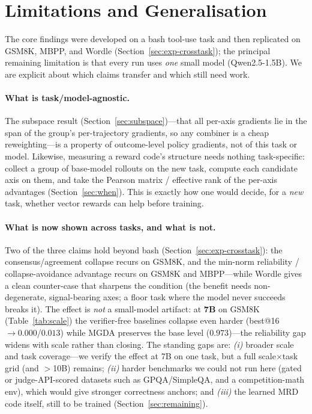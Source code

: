 \documentclass[11pt,a4paper]{article}
\begin{document}
\section{Limitations and Generalisation}
\label{sec:limitations}

The core findings were developed on a bash tool-use task and then replicated on
GSM8K, MBPP, and Wordle (Section~\ref{sec:exp-crosstask}); the principal
remaining limitation is that every run uses \emph{one} small model
(Qwen2.5-1.5B).  We are explicit about which claims transfer and which still need
work.

\paragraph{What is task/model-agnostic.}
The subspace result (Section~\ref{sec:subspace})---that all per-axis gradients
lie in the span of the group's per-trajectory gradients, so any combiner is a
cheap reweighting---is a property of outcome-level policy gradients, not of this
task or model.  Likewise, measuring a reward code's structure needs nothing
task-specific: collect a group of base-model rollouts on the new task, compute
each candidate axis on them, and take the Pearson matrix / effective rank of the
per-axis advantages (Section~\ref{sec:when}).  This is exactly how one would
decide, for a \emph{new} task, whether vector rewards can help before training.

\paragraph{What is now shown across tasks, and what is not.}
Two of the three claims hold beyond bash (Section~\ref{sec:exp-crosstask}): the
consensus/agreement collapse recurs on GSM8K, and the min-norm reliability /
collapse-avoidance advantage recurs on GSM8K and MBPP---while Wordle gives a
clean counter-case that sharpens the condition (the benefit needs
non-degenerate, signal-bearing axes; a floor task where the model never succeeds
breaks it).  The effect is \emph{not} a small-model artifact: at \textbf{7B} on
GSM8K (Table~\ref{tab:scale}) the verifier-free baselines collapse even harder
(best@16 $\to 0.000$/$0.013$) while MGDA preserves the base level
($0.973$)---the reliability gap widens with scale rather than closing.  The
standing gaps are: \emph{(i)} broader scale and task coverage---we verify the
effect at 7B on one task, but a full scale$\times$task grid (and $>$10B) remains;
\emph{(ii)} harder benchmarks we could not run here (gated or judge-API-scored
datasets such as GPQA/SimpleQA, and a competition-math env), which would give
stronger correctness anchors; and \emph{(iii)} the learned MRD code itself, still
to be trained (Section~\ref{sec:remaining}).
\end{document}
